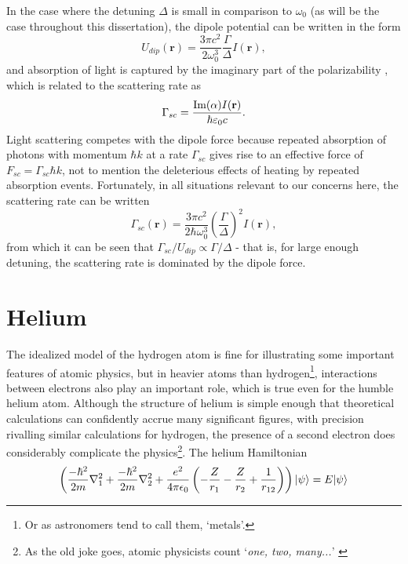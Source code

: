 	In the case where the detuning $\Delta$ is small in comparison to $\omega_0$ (as will be the case throughout this dissertation), the dipole potential can be written in the form \cite{Grimm00}
	\begin{equation}
		U_{dip}(\textbf{r}) = \frac{3\pi c^2}{2\omega_0^3}\frac{\Gamma}{\Delta}I(\textbf{r}),
	\end{equation}
	and absorption of light is captured by the imaginary part of the polarizability \cite{FootAtomic}, which is related to the scattering rate as
	\begin{equation}
		\Gamma_{sc} = \frac{\textrm{Im}(\alpha)I(\textbf{r})}{\hbar\varepsilon_0 c}.
	\end{equation}
	Light scattering competes with the dipole force because repeated absorption of photons with momentum $\hbar k$ at a rate $\Gamma_{sc}$ gives rise to an effective force of $F_{sc}=\Gamma_{sc}\hbar k$, not to mention the deleterious effects of heating by repeated absorption events.
	Fortunately, in all situations relevant to our concerns here, the scattering rate can be written 
	\begin{equation}
		\Gamma_{sc}(\textbf{r}) = \frac{3\pi c^2}{2\hbar\omega_0^3}\left(\frac{\Gamma}{\Delta}\right)^2 I(\textbf{r}),
	\end{equation}
	from which it can be seen that $\Gamma_{sc}/U_{dip} \propto \Gamma/\Delta$ - that is, for large enough detuning, the scattering rate is dominated by the dipole force.
	

		
\section{Helium} 

	The idealized model of the hydrogen atom is fine for illustrating some important features of atomic physics, but in heavier atoms than hydrogen\footnote{Or as astronomers tend to call them, `metals'.}, interactions between electrons also play an important role, which is true even for the humble helium atom.
	Although the structure of helium is simple enough that theoretical calculations can confidently accrue many significant figures, with precision rivalling similar calculations for hydrogen, the presence of a second electron does considerably complicate the physics\footnote{As the old joke goes, atomic physicists count `\emph{one, two, many...}' \cite{FootAtomic}}.
	The helium Hamiltonian 
	$$
	\left(\frac{-\hbar^2}{2m}\nabla_{1}^2+\frac{-\hbar^2}{2m}\nabla_{2}^2 + \frac{e^2}{4\pi\epsilon_0}\left(-\frac{Z}{r_1}-\frac{Z}{r_2}+\frac{1}{r_{12}}\right) \right)|\psi\rangle = E |\psi\rangle
	$$

